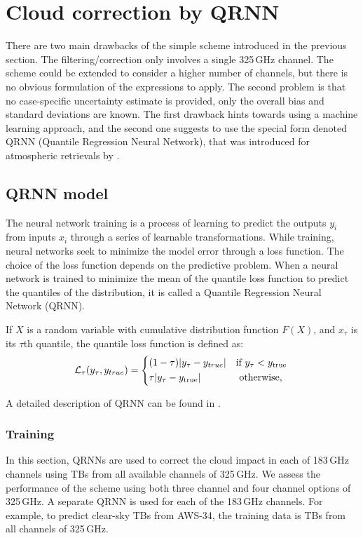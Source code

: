 \documentclass[12pt]{article}
\begin{document}
\section{Cloud correction by QRNN}
%
There are two main drawbacks of the simple scheme introduced in the previous
section. The filtering/correction only involves a single 325\,GHz channel. The
scheme could be extended to consider a higher number of channels, but there is
no obvious formulation of the expressions to apply. The second problem is that
no case-specific uncertainty estimate is provided, only the overall bias and
standard deviations are known. The first drawback hints towards using a machine
learning approach, and the second one suggests to use the special form denoted
QRNN (Quantile Regression Neural Network), that was introduced for atmospheric
retrievals by \citet{pfreundschuh:aneur:18}.

\subsection{QRNN model}
%
The neural network training is a process of learning to predict the outputs {$y_i$} from inputs {$x_i$} through a series of learnable transformations. While training, neural networks seek to minimize the model error through a loss function. The choice of the loss function depends on the predictive problem. When a neural network is trained to minimize the mean of the quantile loss function to predict the quantiles of the distribution, it is called a Quantile Regression Neural Network (QRNN). 

If $X$ is a random variable with cumulative distribution function $F(X)$, and $x_{\tau}$ is its $\tau$th quantile, the quantile loss function is defined as:
\begin{equation}
\mathcal{L}_\tau(y_\tau, y_{true}) =
\begin{cases*}
(1 - \tau)|y_\tau - y_{true}| &\text{if}  $y_\tau < y_\text{true}$\\
\tau |y_\tau - y_\text{true}| & \text{ otherwise, }
\end{cases*}
\label{loss_function}
\end{equation}

A detailed description of QRNN can be found in \citet{pfreundschuh:aneur:18}.  

\subsubsection{Training}
%  
In this section, QRNNs are used to correct the cloud impact in each of 183\,GHz channels using TBs from all available channels of 325\,GHz. We assess the performance of the scheme using both three channel and four channel options of 325\,GHz. A separate QRNN is used for each of the 183\,GHz channels. For example, to predict clear-sky TBs from AWS-34, the training data is TBs from all channels of 325\,GHz.
\end{document}
